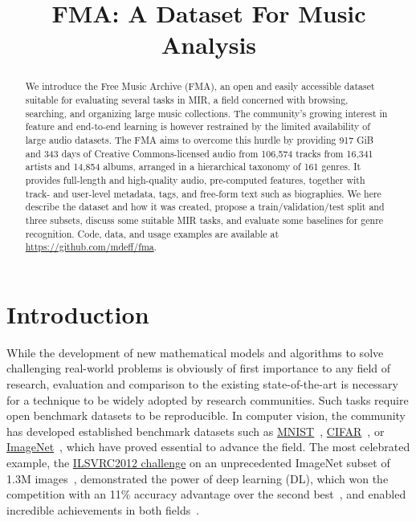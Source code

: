 \documentclass{article}
\title{FMA: A Dataset For Music Analysis}
\newcommand{\ntracks}{106,574 }
\newcommand{\nartists}{16,341 }
\newcommand{\nalbums}{14,854 }
\newcommand{\ngenres}{161 }
\newcommand{\tduration}{343 }
\newcommand{\size}{917 }
\newcommand{\weblink}{https://github.com/mdeff/fma}
\begin{document}
\maketitle

\begin{abstract}
We introduce the Free Music Archive (FMA), an open and easily accessible dataset suitable for evaluating several tasks in MIR, a field concerned with browsing, searching, and organizing large music collections.
The community's growing interest in feature and end-to-end learning is however restrained by the limited availability of large audio datasets.
The FMA aims to overcome this hurdle by providing \size GiB and \tduration days of Creative Commons-licensed audio from \ntracks tracks from \nartists artists and \nalbums albums, arranged in a hierarchical taxonomy of \ngenres genres.
It provides full-length and high-quality audio, pre-computed features, together with track- and user-level metadata, tags, and free-form text such as biographies.
We here describe the dataset and how it was created, propose a train/validation/test split and three subsets, discuss some suitable MIR tasks, and evaluate some
baselines for genre recognition.
Code, data, and usage examples are available at \url{\weblink}.
\end{abstract}

\section{Introduction} %


While the development of new mathematical models and algorithms to solve challenging real-world problems is obviously of first importance to any field of research, evaluation and comparison to the existing state-of-the-art is necessary for a technique to be widely adopted by research communities. Such tasks require open benchmark datasets to be reproducible. %
In computer vision, the community has developed established benchmark datasets such as \href{http://yann.lecun.com/exdb/mnist/}{MNIST}~\cite{mnist}, \href{https://www.cs.toronto.edu/~kriz/cifar.html}{CIFAR}~\cite{cifar}, or \href{http://www.image-net.org}{ImageNet}~\cite{imagenet}, which have proved essential to advance the field. The most celebrated example, the \href{http://www.image-net.org/challenges/LSVRC/2012/}{ILSVRC2012 challenge} on an unprecedented ImageNet subset of 1.3M images~\cite{imagenet_challenge}, demonstrated the power of deep learning (DL), which won the competition with an 11\% accuracy advantage over the second best~\cite{convnet_imagenet}, and enabled incredible achievements in both fields~\cite{dl}.
\end{document}
